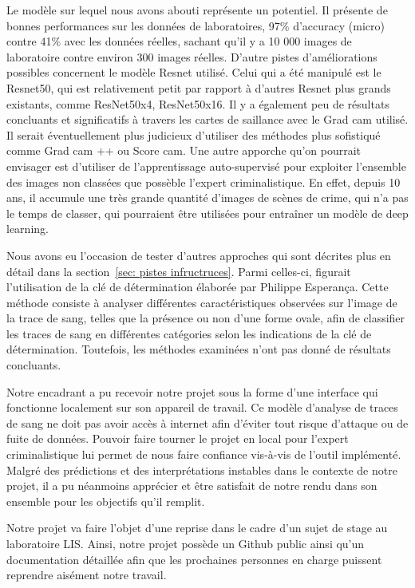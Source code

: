 \documentclass[a4paper]{article}
\begin{document}
Le modèle sur lequel nous avons abouti représente un potentiel. Il présente de bonnes performances sur les données de laboratoires, 97\% d'accuracy (micro) contre 41\% avec les données réelles, sachant qu'il y a 10 000 images de laboratoire contre environ 300 images réelles.
D'autre pistes d'améliorations possibles concernent le modèle Resnet utilisé. Celui qui a été manipulé est le Resnet50, qui est relativement petit par rapport à d'autres Resnet plus grands existants, comme ResNet50x4, ResNet50x16. Il y a également peu de résultats concluants et significatifs à travers les cartes de saillance avec le Grad cam utilisé. Il serait éventuellement plus judicieux d'utiliser des méthodes plus sofistiqué comme Grad cam ++ ou Score cam. Une autre apporche qu'on pourrait envisager est d'utiliser de l'apprentissage auto-supervisé pour exploiter l'ensemble des images non classées que possèble l'expert criminalistique. En effet, depuis 10 ans, il accumule une très grande quantité d'images de scènes de crime, qui n'a pas le temps de classer, qui pourraient être utilisées pour entraîner un modèle de deep learning.

Nous avons eu l'occasion de tester d'autres approches qui sont décrites plus en détail dans la section~\ref{sec: pistes infructruces}. Parmi celles-ci, figurait l'utilisation de la clé de détermination élaborée par Philippe Esperança. Cette méthode consiste à analyser différentes caractéristiques observées sur l'image de la trace de sang, telles que la présence ou non d'une forme ovale, afin de classifier les traces de sang en différentes catégories selon les indications de la clé de détermination. Toutefois, les méthodes examinées n'ont pas donné de résultats concluants.

Notre encadrant a pu recevoir notre projet sous la forme d'une interface qui fonctionne localement sur son appareil de travail. Ce modèle d'analyse de traces de sang ne doit pas avoir accès à internet afin d'éviter tout risque d'attaque ou de fuite de données. Pouvoir faire tourner le projet en local pour l'expert criminalistique lui permet de nous faire confiance vis-à-vis de l'outil implémenté. Malgré des prédictions et des interprétations instables dans le contexte de notre projet, il a pu néanmoins apprécier et être satisfait de notre rendu dans son ensemble pour les objectifs qu'il remplit.

Notre projet va faire l'objet d'une reprise dans le cadre d'un sujet de stage au laboratoire LIS. Ainsi, notre projet possède un Github public ainsi qu'un documentation détaillée afin que les prochaines personnes en charge puissent reprendre aisément notre travail. 
\end{document}
